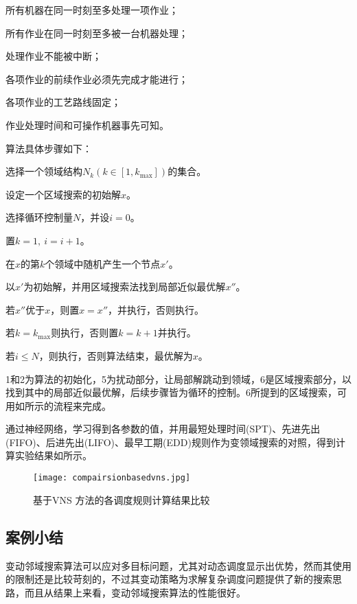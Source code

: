 \begin{asparaitem}
\item 所有机器在同一时刻至多处理一项作业；
\item 所有作业在同一时刻至多被一台机器处理；
\item 处理作业不能被中断；
\item 各项作业的前续作业必须先完成才能进行；
\item 各项作业的工艺路线固定；
\item 作业处理时间和可操作机器事先可知。
\end{asparaitem}
算法具体步骤如下：
\begin{asparaenum}
\renewcommand{\labelenumi}{\heiti 步骤\theenumi~}
\item 选择一个领域结构$N_k(k\in [1,k_{\max}])$的集合。
\item 设定一个区域搜索的初始解$x$。
\item 选择循环控制量$N$，并设$i=0$。
\item 置$k = 1,\ i = i+1$。
\item 在$x$的第$k$个领域中随机产生一个节点$x'$。
\item 以$x'$为初始解，并用区域搜索法找到局部近似最优解$x''$。
\item 若$x''$优于$x$，则置$x = x''$，并执行，否则执行。
\item 若$k = k_{\max}$则执行，否则置$k = k+1$并执行。
\item 若$i\leqslant N$，则执行，否则算法结束，最优解为$x$。
\end{asparaenum}

\Step1和\Step2为算法的初始化，\Step5为扰动部分，让局部解跳动到领域，\Step6是区域搜索部分，以找到其中的局部近似最优解，后续步骤皆为循环的控制。\Step6所提到的区域搜索，可用如所示的流程来完成。

通过神经网络，学习得到各参数的值，并用最短处理时间(SPT)、先进先出(FIFO)、后进先出(LIFO)、最早工期(EDD)规则作为变领域搜索的对照，得到计算实验结果如所示。
\begin{figure}[h]
\centering
\texttt{[image: compairsionbasedvns.jpg]}
\caption{基于VNS 方法的各调度规则计算结果比较\label{fig:vnscompare}}
\end{figure}
\subsection{案例小结}
变动邻域搜索算法可以应对多目标问题，尤其对动态调度显示出优势，然而其使用的限制还是比较苛刻的，不过其变动策略为求解复杂调度问题提供了新的搜索思路，而且从结果上来看，变动邻域搜索算法的性能很好。
